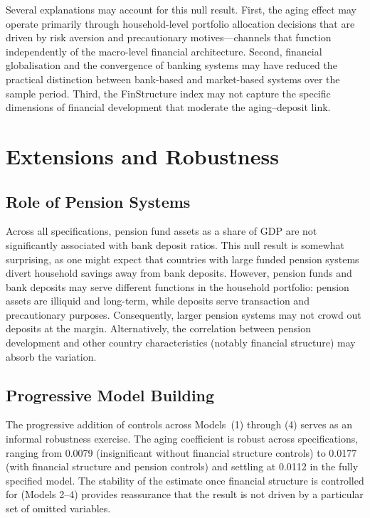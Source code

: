 \documentclass[12pt,a4paper]{article}
\begin{document}
Several explanations may account for this null result. First, the aging effect may operate primarily through household-level portfolio allocation decisions that are driven by risk aversion and precautionary motives---channels that function independently of the macro-level financial architecture. Second, financial globalisation and the convergence of banking systems may have reduced the practical distinction between bank-based and market-based systems over the sample period. Third, the FinStructure index may not capture the specific dimensions of financial development that moderate the aging--deposit link.


\section{Extensions and Robustness}
\label{sec:extensions}

\subsection{Role of Pension Systems}

Across all specifications, pension fund assets as a share of GDP are not significantly associated with bank deposit ratios. This null result is somewhat surprising, as one might expect that countries with large funded pension systems divert household savings away from bank deposits. However, pension funds and bank deposits may serve different functions in the household portfolio: pension assets are illiquid and long-term, while deposits serve transaction and precautionary purposes. Consequently, larger pension systems may not crowd out deposits at the margin. Alternatively, the correlation between pension development and other country characteristics (notably financial structure) may absorb the variation.

\subsection{Progressive Model Building}

The progressive addition of controls across Models~(1) through (4) serves as an informal robustness exercise. The aging coefficient is robust across specifications, ranging from 0.0079 (insignificant without financial structure controls) to 0.0177 (with financial structure and pension controls) and settling at 0.0112 in the fully specified model. The stability of the estimate once financial structure is controlled for (Models 2--4) provides reassurance that the result is not driven by a particular set of omitted variables.
\end{document}

